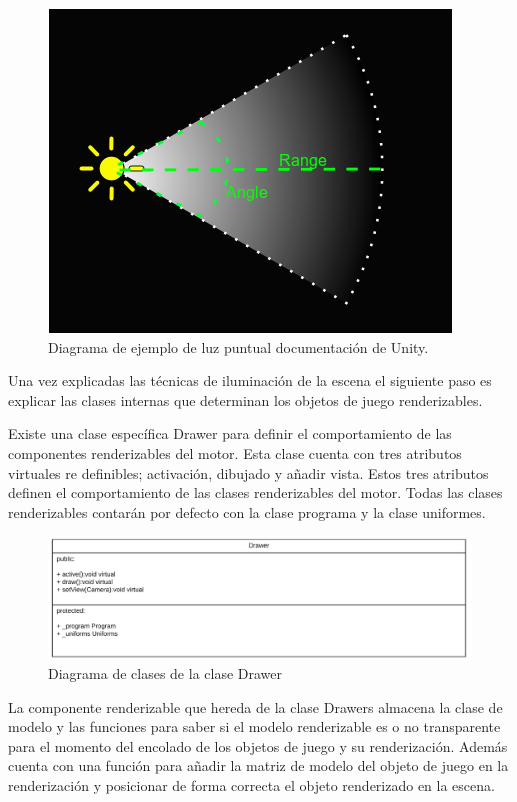 \documentclass[a4paper, 17pt]{book}
\begin{document}
\begin{figure}[hbt!]
    \centering
    \includegraphics[scale=0.5, keepaspectratio]{img/SpotLightDiagram.png}
    \caption{Diagrama de ejemplo de luz puntual documentación de Unity.}
    \label{figura:SpotLightDiagram}
\end{figure}

Una vez explicadas las técnicas de iluminación de la escena el siguiente paso es explicar las clases internas
que determinan los objetos de juego renderizables.

Existe una clase específica Drawer para definir el comportamiento de las componentes renderizables del motor.
Esta clase cuenta con tres atributos virtuales re definibles; activación, dibujado y añadir vista. Estos tres
atributos definen el comportamiento de las clases renderizables del motor. Todas las clases renderizables contarán
por defecto con la clase programa y la clase uniformes.

\begin{figure}[hbt!]
    \centering
    \includegraphics[scale=0.25, keepaspectratio]{img/Drawer.png}
    \caption{Diagrama de clases de la clase Drawer}
    \label{figura:Drawer}
\end{figure}

La componente renderizable que hereda de la clase Drawers almacena la clase de modelo y las funciones para saber si el
modelo renderizable es o no transparente para el momento del encolado de los objetos de juego y su renderización. Además
cuenta con una función para añadir la matriz de modelo del objeto de juego en la renderización y posicionar de forma
correcta el objeto renderizado en la escena.
\end{document}
